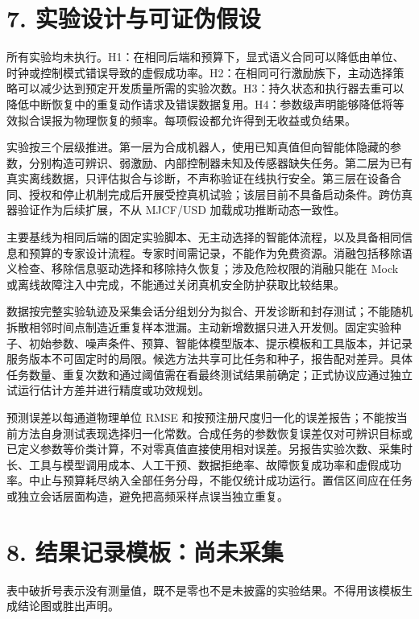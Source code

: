 \documentclass[
  chinese,
  11pt,
  a4paper,
  fontset=fandol]{ctexart}
\begin{document}
\section{7.
实验设计与可证伪假设}\label{ux5b9eux9a8cux8bbeux8ba1ux4e0eux53efux8bc1ux4f2aux5047ux8bbe}

所有实验均未执行。H1：在相同后端和预算下，显式语义合同可以降低由单位、时钟或控制模式错误导致的虚假成功率。H2：在相同可行激励族下，主动选择策略可以减少达到预定开发质量所需的实验次数。H3：持久状态和执行器去重可以降低中断恢复中的重复动作请求及错误数据复用。H4：参数级声明能够降低将等效拟合误报为物理恢复的频率。每项假设都允许得到无收益或负结果。

实验按三个层级推进。第一层为合成机器人，使用已知真值但向智能体隐藏的参数，分别构造可辨识、弱激励、内部控制器未知及传感器缺失任务。第二层为已有真实离线数据，只评估拟合与诊断，不声称验证在线执行安全。第三层在设备合同、授权和停止机制完成后开展受控真机试验；该层目前不具备启动条件。跨仿真器验证作为后续扩展，不从
MJCF/USD 加载成功推断动态一致性。

主要基线为相同后端的固定实验脚本、无主动选择的智能体流程，以及具备相同信息和预算的专家设计流程。专家时间需记录，不能作为免费资源。消融包括移除语义检查、移除信息驱动选择和移除持久恢复；涉及危险权限的消融只能在
Mock 或离线故障注入中完成，不能通过关闭真机安全防护获取比较结果。

数据按完整实验轨迹及采集会话分组划分为拟合、开发诊断和封存测试；不能随机拆散相邻时间点制造近重复样本泄漏。主动新增数据只进入开发侧。固定实验种子、初始参数、噪声条件、预算、智能体模型版本、提示模板和工具版本，并记录服务版本不可固定时的局限。候选方法共享可比任务和种子，报告配对差异。具体任务数量、重复次数和通过阈值需在看最终测试结果前确定；正式协议应通过独立试运行估计方差并进行精度或功效规划。

预测误差以每通道物理单位 RMSE
和按预注册尺度归一化的误差报告；不能按当前方法自身测试表现选择归一化常数。合成任务的参数恢复误差仅对可辨识目标或已定义参数等价类计算，不对零真值直接使用相对误差。另报告实验次数、采集时长、工具与模型调用成本、人工干预、数据拒绝率、故障恢复成功率和虚假成功率。中止与预算耗尽纳入全部任务分母，不能仅统计成功运行。置信区间应在任务或独立会话层面构造，避免把高频采样点误当独立重复。

\section{8.
结果记录模板：尚未采集}\label{ux7ed3ux679cux8bb0ux5f55ux6a21ux677fux5c1aux672aux91c7ux96c6}

表中破折号表示没有测量值，既不是零也不是未披露的实验结果。不得用该模板生成结论图或胜出声明。
\end{document}
